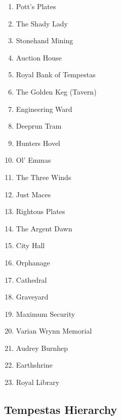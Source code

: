 \begin{center}
{\begin{multicols}{3}
\begin{enumerate}
			\item Pott's Plates
			\item The Shady Lady
			\item Stonehand Mining
			\item Auction House
			\item Royal Bank of Tempestas
			\item The Golden Keg (Tavern)
			\item Engineering Ward
			\item Deeprun Tram
			\item Hunters Hovel
			\item Ol' Emmas
			\item The Three Winds
			\item Just Maces
			\item Rightous Plates
			\item The Argent Dawn
			\item City Hall
			\item Orphanage
			\item Cathedral
			\item Graveyard
			\item Maximum Security
			\item Varian Wrynn Memorial
			\item Audrey Burnhep
			\item Earthshrine
			\item Royal Library
		\end{enumerate}
	\end{multicols}}
\end{center}

\subsection{Tempestas Hierarchy}

